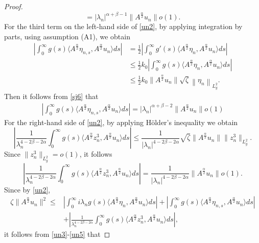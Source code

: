 \documentclass[10pt,a4paper]{amsart}
\begin{document}
\begin{proof}
\begin{equation}
			= |\lambda_n|^{\alpha + \beta - 1} \| A^{\frac{\alpha}{2}} u_n \| o(1).
		\end{equation}
		For the third term on the left-hand side of \eqref{un2}, by applying integration by parts, using assumption (A1), we obtain
\begin{align*}
\left| \int_0^\infty g(s) \langle A^{\frac{\alpha}{2}} \eta_{n,s}, A^{\frac{\alpha}{2}} u_n \rangle ds\right |
			&= \frac12\left|\int_0^\infty g'(s) \langle A^{\frac{\alpha}{2}} \eta_n, A^{\frac{\alpha}{2}} u_n \rangle ds \right|  \\
			&\leq \frac12k_0 \left| \int_0^\infty g(s) \langle A^{\frac{\alpha}{2}} \eta_n, A^{\frac{\alpha}{2}} u_n \rangle ds \right|  \\
			&\leq \frac12k_0 \| A^{\frac{\alpha}{2}} u_n \| \sqrt{\zeta} \left\| \eta_n \right\|_{L_g^2} .
\end{align*}
Then it follows from \eqref{sj6} that
		\begin{align}\label{un4}
		\left| \int_0^\infty g(s) \langle A^{\frac{\alpha}{2}} \eta_{n,s}, A^{\frac{\alpha}{2}} u_n \rangle ds\right |= |\lambda_n|^{\alpha+\beta-2}  \| A^{\frac{\alpha}{2}} u_n \| o(1)
		\end{align}
		 For the right-hand side of \eqref{un2}, by applying H\"older's inequality we obtain
\[\left| \frac{1}{\lambda_n^{4-2\beta-2\alpha}} \int_0^\infty g(s) \langle A^{\frac{\alpha}{2}} z_n^3, A^{\frac{\alpha}{2}} u_n \rangle ds \right|
			\le \frac{1}{|\lambda_n|^{4-2\beta-2\alpha}} \sqrt{\zeta} \| A^{\frac{\alpha}{2}} u_n \|\|z_n^3\|_{L_g^2}.\]
Since $\|z_n^3\|_{L_g^2}=o(1)$, it follows
		\begin{equation}\label{un5}
			\left| \frac{1}{\lambda_n^{4-2\beta-2\alpha}} \int_0^\infty g(s) \langle A^{\frac{\alpha}{2}} z_n^3, A^{\frac{\alpha}{2}} u_n \rangle ds \right|
			=\frac{1}{|\lambda_n|^{4-2\beta-2\alpha}}\| A^{\frac{\alpha}{2}} u_n \| o(1).
		\end{equation}
Since by \eqref{un2},
\begin{align*}
 \zeta\|A^{\frac{\alpha}{2}}u_n\|^2\le&\left| \int_0^\infty i\lambda_n g(s) \langle A^{\frac{\alpha}{2}} \eta_n, A^{\frac{\alpha}{2}} u_n \rangle ds \right|+\left| \int_0^\infty g(s) \langle A^{\frac{\alpha}{2}} \eta_{n,s}, A^{\frac{\alpha}{2}} u_n \rangle ds\right |\\
 &+\left| \frac{1}{\lambda_n^{4-2\beta-2\alpha}} \int_0^\infty g(s) \langle A^{\frac{\alpha}{2}} z_n^3, A^{\frac{\alpha}{2}} u_n \rangle ds \right|,
\end{align*}
it follows from \eqref{un3}-\eqref{un5} that

\end{proof}
\end{document}
